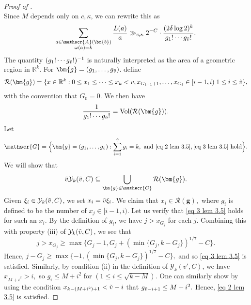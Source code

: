 \documentclass{amsart}
\theoremstyle{definition}
\numberwithin{equation}{section}
\newcommand{\R}{\mathbb{R}}
\newcommand{\density}{\delta}
\DeclareMathOperator{\Vol}{Vol}
\begin{document}
\begin{proof}[Proof of ]
\begin{equation*}
	\end{equation*}
	Since $M$ depends only on $c,\kappa$, we can rewrite this as
	\begin{equation}\label{L to factorials 2}
		\sum_{\substack{a \in \mathscr{A}(\bm{b}) \\ \omega(a) = k}} \frac{L(a)}{a} \gg_{c,\kappa} 2^{-C} \cdot \frac{(2 \density \log 2)^k}{g_1! \cdots g_{\Tilde{v}}!}.
	\end{equation}
	The quantity $(g_1! \cdots g_{\Tilde{v}}!)^{-1}$ is naturally interpreted as the area of a geometric region in $\R^k$. For $\bm{g} = (g_1, \dots, g_{\Tilde{v}})$. define
	$$\mathcal{R}(\bm{g}) = \{x \in \R^k : 0 \leq x_1 \leq \cdots \leq x_k <v , x_{G_{i-1}+1},\dots,x_{G_{i}} \in [i-1,i)\;1 \leq i \leq \Tilde{v}\},$$
	with the convention that $G_0 = 0$. We then have
	\begin{equation} \label{eq 3.5 lem 3.5}
		\frac{1}{g_1! \cdots g_{\Tilde{v}}!} = \Vol(\mathcal{R}(\bm{g})).
	\end{equation}
	Let $$\mathscr{G} = \Big\{\bm{g}=(g_1, \dots, g_{\Tilde{v}}): \sum_{i = 1}^{\Tilde{v}} g_i =k, \text{ and } \eqref{eq 2 lem 3.5}, \eqref{eq 3 lem 3.5}\text{ hold} \Big\}.$$
	We will show that
	\begin{equation}\label{eq 4 lem 3.5}
		\Tilde{v} \mathcal{Y}_k (\Tilde{v},C) \subseteq \bigcup_{\bm{g} \in \mathscr{G}} \mathcal{R}(\bm{g}).
	\end{equation}
	Given $\xi_i \in \mathcal{Y}_k(\Tilde{v},C)$, we set $x_i = \Tilde{v}\xi_i$. We claim that $x_i \in \mathcal{R}(\bm{g}),$ where $g_i$ is defined to be the number of $x_j \in [i-1,i)$. Let us verify that \eqref{eq 3 lem 3.5} holds for such an $x_i$. By the definition of $g_i$, we have $j > x_{G_j}$ for each $j$. Combining this with property (iii) of $\mathcal{Y}_k(\Tilde{v},C)$, we see that
	$$j > x_{G_j} \geq \max\{G_j-1, G_j + (\min\{G_j,k-G_j\})^{1/7} -C\}.$$
	Hence, $j - G_j \geq \max\{-1,(\min\{G_j,k-G_j\})^{1/7}-C\},$
	and so \eqref{eq 3 lem 3.5} is satisfied. Similarly, by condition (ii) in the definition of $\mathcal{Y}_k(v',C)$, we have $x_{M+i^2} > i,$ so $g_i \leq M+i^2$ for $(1 \leq i \leq \sqrt{k-M})$. One can similarly show by using the condition $x_{k-(M+i^2)+1} < \Tilde{v}-i$ that $g_{\Tilde{v}-i+1} \leq M+i^2.$ Hence, \eqref{eq 2 lem 3.5} is satisfied. 
	

\end{proof}
\end{document}
